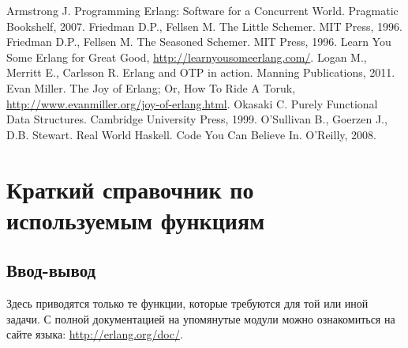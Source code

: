 \documentclass[
  paper=a4,
  fontsize=14pt,
  openany,
  appendixprefix=true
]{scrbook}
\begin{document}
\begin{thebibliography}{99}
Armstrong J. Programming Erlang: Software for a Concurrent World. Pragmatic Bookshelf, 2007.
Friedman D.P., Fellsen M. The Little Schemer. MIT Press, 1996.
Friedman D.P., Fellsen M. The Seasoned Schemer. MIT Press, 1996.
Learn You Some Erlang for Great Good, \url{http://learnyousomeerlang.com/}.
Logan M., Merritt E., Carlsson R. Erlang and OTP in action. Manning Publications, 2011.
Evan Miller. The Joy of Erlang; Or, How To Ride A Toruk, \url{http://www.evanmiller.org/joy-of-erlang.html}.
Okasaki C. Purely Functional Data Structures. Cambridge University Press, 1999.
O'Sullivan B., Goerzen J., D.B. Stewart. Real World Haskell. Code You Can Believe In. O'Reilly, 2008.
\end{thebibliography}

\appendix

\pagebreak
{}

\chapter{Краткий справочник по используемым функциям}

\section*{Ввод-вывод}

Здесь приводятся только те функции, которые требуются для той или иной задачи. С полной документацией на упомянутые модули можно ознакомиться на сайте языка: \url{http://erlang.org/doc/}.

\begin{funcdescr}
\end{funcdescr}
\end{document}
